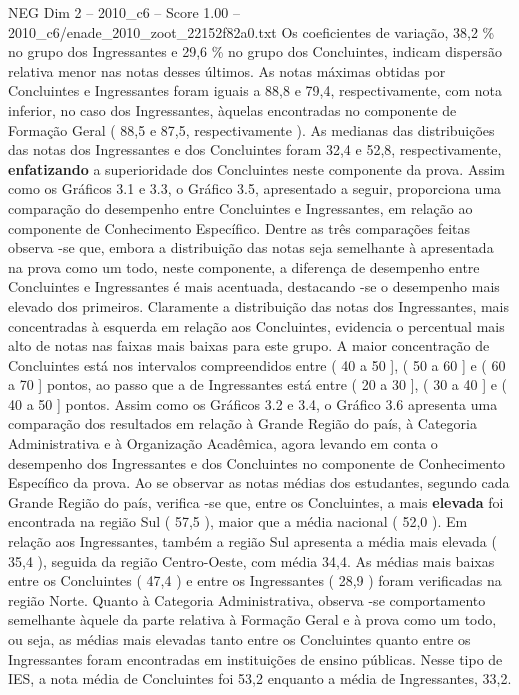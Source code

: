 \begin{textsample}{NEG Dim 2 – 2010\_c6 – Score 1.00 – 2010\_c6/enade\_2010\_zoot\_22152f82a0.txt}
Os coeficientes de variação, 38,2 \% no grupo dos Ingressantes e 29,6 \% no grupo dos Concluintes, indicam dispersão relativa menor nas notas desses últimos.
As notas máximas obtidas por Concluintes e Ingressantes foram iguais a 88,8 e 79,4, respectivamente, com nota inferior, no caso dos Ingressantes, àquelas encontradas no componente de Formação Geral ( 88,5 e 87,5, respectivamente ).
As medianas das distribuições das notas dos Ingressantes e dos Concluintes foram 32,4 e 52,8, respectivamente, \textbf{enfatizando} a superioridade dos Concluintes neste componente da prova.
Assim como os Gráficos 3.1 e 3.3, o Gráfico 3.5, apresentado a seguir, proporciona uma comparação do desempenho entre Concluintes e Ingressantes, em relação ao componente de Conhecimento Específico.
Dentre as três comparações feitas observa -se que, embora a distribuição das notas seja semelhante à apresentada na prova como um todo, neste componente, a diferença de desempenho entre Concluintes e Ingressantes é mais acentuada, destacando -se o desempenho mais elevado dos primeiros.
Claramente a distribuição das notas dos Ingressantes, mais concentradas à esquerda em relação aos Concluintes, evidencia o percentual mais alto de notas nas faixas mais baixas para este grupo.
A maior concentração de Concluintes está nos intervalos compreendidos entre ( 40 a 50 ], ( 50 a 60 ] e ( 60 a 70 ] pontos, ao passo que a de Ingressantes está entre ( 20 a 30 ], ( 30 a 40 ] e ( 40 a 50 ] pontos.
Assim como os Gráficos 3.2 e 3.4, o Gráfico 3.6 apresenta uma comparação dos resultados em relação à Grande Região do país, à Categoria Administrativa e à Organização Acadêmica, agora levando em conta o desempenho dos Ingressantes e dos Concluintes no componente de Conhecimento Específico da prova.
Ao se observar as notas médias dos estudantes, segundo cada Grande Região do país, verifica -se que, entre os Concluintes, a mais \textbf{elevada} foi encontrada na região Sul ( 57,5 ), maior que a média nacional ( 52,0 ).
Em relação aos Ingressantes, também a região Sul apresenta a média mais elevada ( 35,4 ), seguida da região Centro-Oeste, com média 34,4.
As médias mais baixas entre os Concluintes ( 47,4 ) e entre os Ingressantes ( 28,9 ) foram verificadas na região Norte.
Quanto à Categoria Administrativa, observa -se comportamento semelhante àquele da parte relativa à Formação Geral e à prova como um todo, ou seja, as médias mais elevadas tanto entre os Concluintes quanto entre os Ingressantes foram encontradas em instituições de ensino públicas.
Nesse tipo de IES, a nota média de Concluintes foi 53,2 enquanto a média de Ingressantes, 33,2.

\end{textsample}
